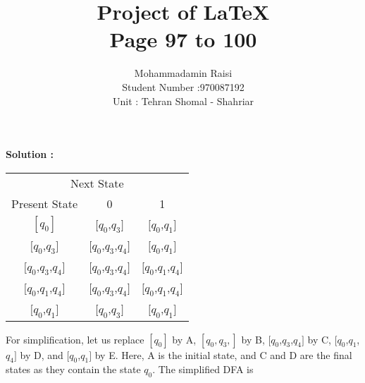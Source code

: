 \documentclass [10pt,a4paper,tikz] {book}
\begin{document}
\title{Project of \LaTeX \\ Page 97 to 100
}

\author{Mohammadamin Raisi\\ Student Number :970087192 \\ Unit : Tehran Shomal - Shahriar
}

\maketitle



\renewcommand{\thepage}{Page \arabic{page} $|$ Introduction to Automata Theory, Formal Languages and Computation }

\textbf{Solution :}

\begin{center}

\begin{tabular}{ccc}

\toprule
\multicolumn{3}{c}{Next State} \\

\cmidrule(r){2-3}
 Present State  & 0  & 1 \\
    \midrule
    $[{q}_{0}]$ & $[{q}_{0}$,${q}_{3}]$ & $[{q}_{0}$,${q}_{1 }]$\\
    $[{q}_{0}$,${q}_{3}]$ & $[{q}_{0}$,${q}_{3}$,${q}_{4}]$ & $[{q}_{0}$,${q}_{1}]$ \\
    $[{q}_{0}$,${q}_{3}$,${q}_{4}]$ & $[{q}_{0}$,${q}_{3}$,${q}_{4}]$ & $[{q}_{0}$,${q}_{1}$,${q}_{4}]$ \\
    $[{q}_{0}$,${q}_{1}$,${q}_{4}]$ & $[{q}_{0}$,${q}_{3}$,${q}_{4}]$ & $[{q}_{0}$,${q}_{1}$,${q}_{4}]$ \\
    $[{q}_{0}$,${q}_{1}]$ & $[{q}_{0}$,${q}_{3}]$ & $[{q}_{0}$,${q}_{1}]$ \\
    \bottomrule


\end{tabular}

\end{center}



For simplification, let us replace $[{q}_{0}]$ by A, $[{q}_{0},{q}_{3},]$ by B, $[{q}_{0}$,${q}_{3}$,${q}_{4}]$ by C, $[{q}_{0}$,${q}_{1}$,${q}_{4}]$ by D, and
$[{q}_{0}$,${q}_{1}]$ by E. Here, A is the initial state, and C and D are the final states as they contain the state ${q}_{0}$.
The simplified DFA is
\end{document}

